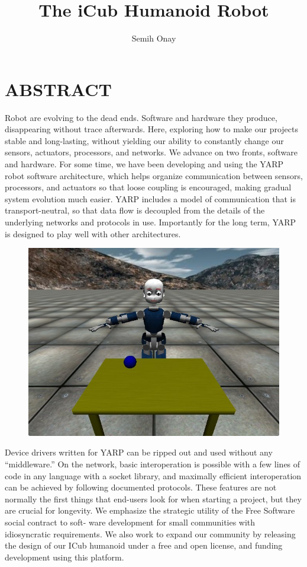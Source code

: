 \documentclass[a4paper, 12pt]{report}
\title{The iCub Humanoid Robot}
\author{Semih Onay}
\begin{document}
\makecstitle

\tableofcontents
\listoffigures
\listoftables

\begin{symabbreviations}
\sym{}{} 
\end{symabbreviations}

\chapter*{ABSTRACT}
Robot are evolving to the dead ends. Software and hardware they produce, 
disappearing without trace afterwards. Here, exploring how to make our 
projects stable and long-lasting, without yielding our ability to 
constantly change our sensors, actuators, processors, and networks.
We advance on two fronts, software and hardware. For some time, we have been 
developing and using the YARP robot software architecture, which helps 
organize communication between sensors, processors, and actuators so that loose 
coupling is encouraged, making gradual system evolution much easier. YARP 
includes a model of communication that is transport-neutral, so that data flow 
is decoupled from the details of the underlying networks and protocols in use. 
Importantly for the long term, YARP is designed to play well with other 
architectures.
\begin{figure}[h!]
\centering
\includegraphics[width=0.8\linewidth]{sim}
\caption{}
\label{fig:sim}
\end{figure}
 Device drivers written for YARP can be ripped out and used 
without any “middleware.” On the network, basic interoperation is possible with 
a few lines of code in any language with a socket library, and maximally 
efficient interoperation can be achieved by following documented protocols. 
These features are not normally the first things that end-users look for when 
starting a project, but they are crucial for longevity.
We emphasize the strategic utility of the Free Software social contract to 
soft- ware development for small communities with idiosyncratic requirements. 
We also work to expand our community by releasing the design of our ICub 
humanoid under a free and open license, and funding development using this 
platform.
\end{document}
